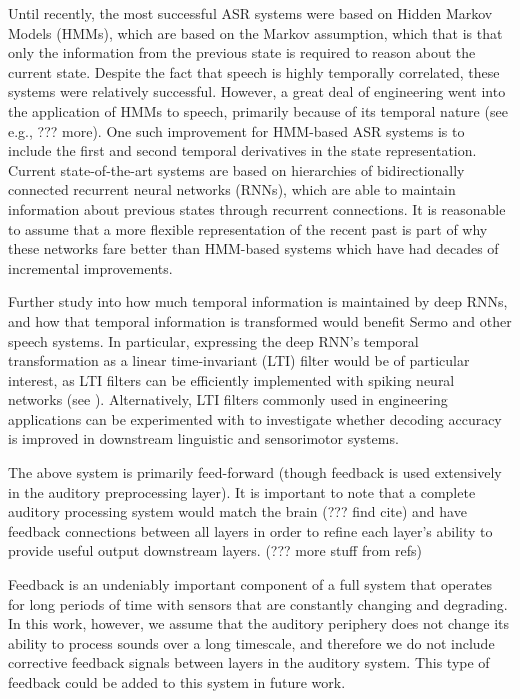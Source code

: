 Until recently,
the most successful ASR systems
were based on Hidden Markov Models (HMMs),
which are based on the Markov assumption,
which that is that only the information
from the previous state is required
to reason about the current state.
Despite the fact that speech is highly temporally correlated,
these systems were relatively successful.
However, a great deal of engineering
went into the application of HMMs
to speech, primarily because of
its temporal nature
(see e.g., \citealt{rabiner1989} ??? more).
One such improvement for HMM-based ASR systems
is to include the first and second temporal derivatives
in the state representation.
Current state-of-the-art systems
are based on hierarchies of bidirectionally connected
recurrent neural networks (RNNs),
which are able to maintain information about
previous states through recurrent connections.
It is reasonable to assume that
a more flexible representation
of the recent past
is part of why these networks
fare better than HMM-based systems
which have had decades of incremental improvements.

Further study into how much temporal information
is maintained by deep RNNs,
and how that temporal information is transformed
would benefit Sermo
and other speech systems.
In particular, expressing the deep RNN's
temporal transformation as a
linear time-invariant (LTI) filter
would be of particular interest,
as LTI filters can be efficiently implemented
with spiking neural networks
(see \citealt{eliasmith2004}).
Alternatively, LTI filters
commonly used in engineering applications
can be experimented with
to investigate whether decoding accuracy
is improved in downstream
linguistic and sensorimotor systems.

The above system is primarily feed-forward
(though feedback is used extensively in the
auditory preprocessing layer).
It is important to note that
a complete auditory processing system
would match the brain (??? find cite) and have
feedback connections between all layers
in order to refine each layer's ability
to provide useful output downstream layers.
(??? more stuff from refs)

Feedback is an undeniably important
component of a full system that operates
for long periods of time with sensors
that are constantly changing and degrading.
In this work, however, we assume
that the auditory periphery does not change
its ability to process sounds over a long timescale,
and therefore we do not include corrective feedback
signals between layers in the auditory system.
This type of feedback could be added
to this system in future work.

